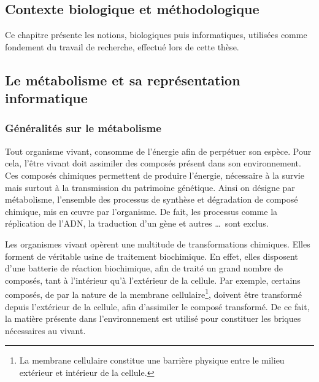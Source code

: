 \begin{refsection}
	\chapter{Contexte biologique et méthodologique}

    Ce chapitre présente les notions, biologiques puis informatiques, utilisées comme fondement du travail de recherche, effectué lors de cette thèse.
    
    
    \section{Le métabolisme et sa représentation informatique}
    \subsection{Généralités sur le métabolisme}
    
    Tout organisme vivant, consomme de l'énergie afin de perpétuer son espèce. Pour cela, l'être vivant doit assimiler des composés présent dans son environnement. Ces composés chimiques permettent de produire l'énergie, nécessaire à la survie mais surtout à la transmission du patrimoine génétique. Ainsi on désigne par métabolisme, l'ensemble des processus de synthèse et dégradation de composé chimique, mis en œuvre par l'organisme. De fait, les processus comme la réplication de l'\gls{ADN}, la traduction d'un gène et autres \ldots~sont exclus.
    
    
    Les organismes vivant opèrent une multitude de transformations chimiques. Elles forment de véritable usine de traitement biochimique. En effet, elles disposent d'une batterie de réaction biochimique, afin de traité un grand nombre de composés, tant à l'intérieur qu'à l'extérieur de la cellule. Par exemple, certains composés, de par la nature de la membrane cellulaire\footnote{La membrane cellulaire constitue une barrière physique entre le milieu extérieur et  intérieur de la cellule.}, doivent être transformé depuis l'extérieur de la cellule, afin d'assimiler le composé transformé. De ce fait, la matière présente dans l'environnement est utilisé pour constituer les briques nécessaires au vivant.
    

\end{refsection}
